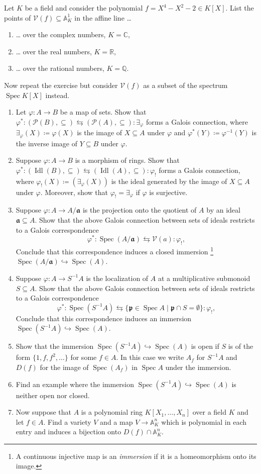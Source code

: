 \documentclass{exercises}
\DeclareMathOperator{\Idl}{Idl}
\DeclareMathOperator{\Spec}{Spec}
\begin{document}
\begin{exercise}
  Let $K$ be a field and consider the polynomial $f=X^4-X^2-2 ∈ K[X]$.
  List the points of $𝒱(f)⊆𝔸^1_K$ in the affine line …
  \begin{enumerate}
    \item … over the complex numbers, $K=ℂ$,
    \item … over the real numbers, $K=ℝ$,
    \item … over the rational numbers, $K=ℚ$.
  \end{enumerate}
  Now repeat the exercise but consider $𝒱(f)$ as a subset of the spectrum $\Spec K[X]$ instead.
\end{exercise}

\begin{exercise}
  \begin{enumerate}
    \item Let $φ:A → B$ be a map of sets.
      Show that $φ^* : (𝒫(B),⊆) ⇆ (𝒫(A),⊆) : ∃_φ$ forms a Galois connection, where $∃_φ(X)\coloneqq φ(X)$ is the image of $X⊆A$ under $φ$ and $φ^*(Y)\coloneqq φ^{-1}(Y)$ is the inverse image of $Y⊆B$ under $φ$.
    \item Suppose $φ:A → B$ is a morphism of rings.
      Show that $φ^* : (\Idl(B),⊆) ⇆ (\Idl(A),⊆) : φ_!$ forms a Galois connection, where $φ_!(X)\coloneqq (∃_φ(X))$ is the ideal generated by the image of $X⊆A$ under $φ$.
      Moreover, show that $φ_!=∃_φ$ if $φ$ is surjective.
    \item Suppose $φ:A → A/𝖆$ is the projection onto the quotient of $A$ by an ideal $𝖆⊆A$.
      Show that the above Galois connection between sets of ideals restricts to a Galois correspondence
      $$
      φ^* : \Spec(A/𝖆) ⇆ 𝒱(a) : φ_!,
      $$
      Conclude that this correspondence induces a closed immersion%
      \footnote{A continuous injective map is an \emph{immersion} if it is a homeomorphism onto its image.}
      $\Spec(A/𝖆) ↪ \Spec(A)$.
    \item Suppose $φ:A → S^{-1}A$ is the localization of $A$ at a multiplicative submonoid $S⊆A$.
      Show that the above Galois connection between sets of ideals restricts to a Galois correspondence
      $$
      φ^* : \Spec(S^{-1}A) ⇆ \{𝖕 ∈ \Spec A \mid 𝖕 ∩ S = ∅\} : φ_!,
      $$
      Conclude that this correspondence induces an immersion $\Spec(S^{-1}A) ↪ \Spec(A)$.
    \item Show that the immersion $\Spec(S^{-1}A) ↪ \Spec(A)$ is open if $S$ is of the form $\{1,f,f^2,\dots\}$ for some $f ∈ A$.
      In this case we write $A_f$ for $S^{-1}A$ and $D(f)$ for the image of $\Spec(A_f)$ in $\Spec A$ under the immersion.
    \item Find an example where the immersion $\Spec(S^{-1}A) ↪ \Spec(A)$ is neither open nor closed.
    \item Now suppose that $A$ is a polynomial ring $K[X_1,\dots,X_n]$ over a field $K$ and let $f ∈ A$.
      Find a variety $V$ and a map $V → 𝔸^n_K$ which is polynomial in each entry and induces a bijection onto $D(f)∩𝔸^n_K$.
  \end{enumerate}
\end{exercise}
\end{document}

